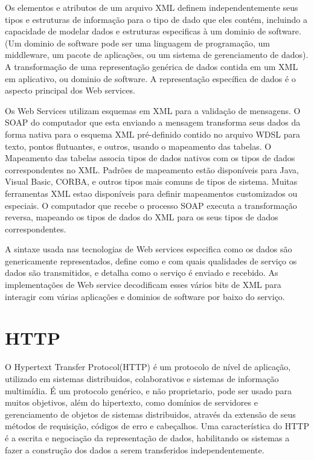 \documentclass{acm_proc_article-sp}
\begin{document}
		Os elementos e atributos de um arquivo XML definem independentemente seus tipos e estruturas de informação para o tipo de dado que eles contém, incluindo a capacidade de modelar dados e estruturas especificas à um dominio de software. (Um dominio de software pode ser uma linguagem de programação, um middleware, um pacote de aplicações, ou um sistema de gerenciamento de dados). A transformação de uma representação genérica de dados contida em um XML em aplicativo, ou dominio de software. A representação específica de dados é o aspecto principal dos Web services.
		
		Os Web Services utilizam esquemas em XML para a validação de mensagens. O SOAP do computador que esta enviando a mensagem transforma seus dados da forma nativa para o esquema XML pré-definido contido no arquivo WDSL para texto, pontos flutuantes, e outros, usando o mapeamento das tabelas. O Mapeamento das tabelas associa tipos de dados nativos com os tipos de dados correspondentes no XML. Padrões de mapeamento estão disponíveis para Java, Visual Basic, CORBA, e outros tipos mais comuns de tipos de sistema. Muitas ferramentas XML estao disponíveis para definir mapeamentos customizados ou especiais. O computador que recebe o processo SOAP executa a transformação reversa, mapeando os tipos de dados do XML para os seus tipos de dados correspondentes.
		
		A sintaxe usada nas tecnologias de Web services especifica como os dados são genericamente representados, define como e com quais qualidades de serviço os dados são transmitidos, e detalha como o serviço é enviado e recebido. As implementações de Web service decodificam esses vários bits de XML para interagir com várias aplicações e dominios de software por baixo do serviço.\cite{UNDERWEBSERVICES}
		
\section{HTTP}
		O Hypertext Transfer Protocol(HTTP) é um protocolo de nível de aplicação, utilizado em sistemas distribuidos, colaborativos e sistemas de informação multimídia. É um protocolo genérico, e não proprietario, pode ser usado para muitos objetivos, além do hipertexto, como domínios de servidores e gerenciamento de objetos de sistemas distribuidos, através da extensão de seus métodos de requisição, códigos de erro e cabeçalhos. Uma característica do HTTP é a escrita e negociação da representação de dados, habilitando os sistemas a fazer a construção dos dados a serem transferidos independentemente.\cite{HTTP-1.1}
\end{document}
